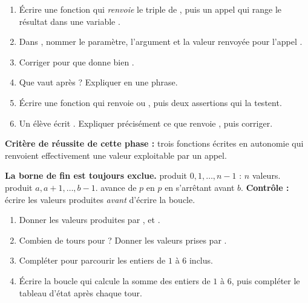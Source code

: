 \documentclass[10pt,a4paper]{article}
\begin{document}
\begin{enumerate}
\needspace{18mm}
\item Écrire une fonction  qui \emph{renvoie} le triple de , puis un appel qui range le résultat dans une variable .
\needspace{18mm}
\item Dans , nommer le paramètre, l'argument et la valeur renvoyée pour l'appel .
\needspace{18mm}
\item Corriger  pour que  donne bien .
\needspace{18mm}
\item Que vaut  après  ? Expliquer en une phrase.
\needspace{18mm}
\item Écrire une fonction  qui renvoie  ou , puis deux assertions qui la testent.
\needspace{18mm}
\item Un élève écrit . Expliquer précisément ce que renvoie , puis corriger.
\end{enumerate}
\begin{successbox}\textbf{Critère de réussite de cette phase :} trois fonctions écrites en autonomie qui renvoient effectivement une valeur exploitable par un appel.\end{successbox}
\certline
\needspace{62mm}\par\vspace{3mm}
\begin{methodbox}
\textbf{La borne de fin est toujours exclue.}
 produit $0, 1, \ldots, n-1$ : $n$ valeurs.
 produit $a, a+1, \ldots, b-1$.
 avance de $p$ en $p$ en s'arrêtant avant $b$.
\textbf{Contrôle :} écrire les valeurs produites \emph{avant} d'écrire la boucle.
\end{methodbox}
\begin{enumerate}
\needspace{18mm}
\item Donner les valeurs produites par ,  et .
\needspace{18mm}
\item Combien de tours pour  ? Donner les valeurs prises par .
\needspace{18mm}
\item Compléter  pour parcourir les entiers de $1$ à $6$ inclus.
\needspace{18mm}
\item Écrire la boucle qui calcule la somme des entiers de $1$ à $6$, puis compléter le tableau d'état après chaque tour.
\end{enumerate}
\end{document}

